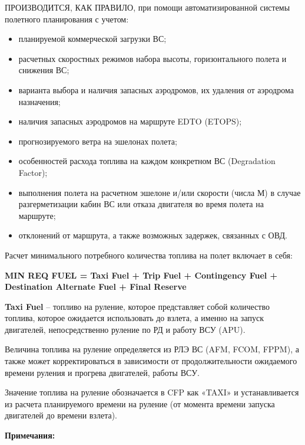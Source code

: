 ПРОИЗВОДИТСЯ, КАК ПРАВИЛО, при помощи автоматизированной системы полетного планирования с учетом: 
    \begin{itemize}
        \item планируемой коммерческой загрузки ВС;
        \item расчетных скоростных режимов набора высоты, горизонтального полета и снижения ВС;
        \item варианта выбора и наличия запасных аэродромов, их удаления от аэродрома назначения;
        \item наличия запасных аэродромов на маршруте EDTO (ETOPS);
        \item прогнозируемого ветра на эшелонах полета;
        \item особенностей расхода топлива на каждом конкретном ВС (Degradation Factor); 
        \item выполнения полета на расчетном эшелоне и/или скорости (числа М) в случае разгерметизации кабин ВС или отказа двигателя во время полета на маршруте; 
        \item отклонений от маршрута, а также возможных задержек, связанных с ОВД.
    \end{itemize}

Расчет минимального потребного количества топлива на полет включает в себя:
    
\textbf{MIN REQ FUEL = Taxi Fuel + Trip Fuel + Contingency Fuel + Destination Alternate Fuel + Final Reserve}

\textbf{Taxi Fuel} – топливо на руление, которое представляет собой количество топлива, которое ожидается использовать до взлета, а именно на запуск двигателей, непосредственно руление по РД и работу ВСУ (APU).

Величина топлива на руление определяется из РЛЭ ВС (AFM, FCOM, FPPM), а также может корректироваться в зависимости от продолжительности ожидаемого времени руления и прогрева двигателей, работы ВСУ.

Значение топлива на руление обозначается в CFP как «TAXI» и устанавливается из расчета планируемого времени на руление (от момента времени запуска двигателей до времени взлета).

\textbf{Примечания:}

